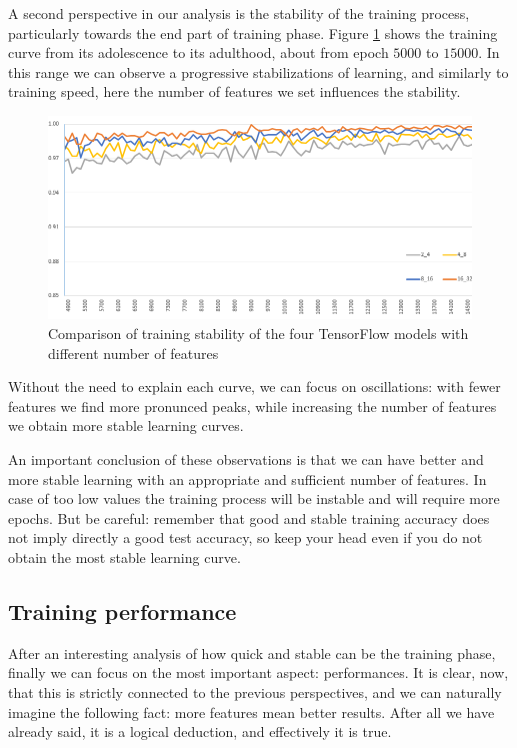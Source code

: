 A second perspective in our analysis is the stability of the training process, particularly towards the end part of training phase. Figure \ref{fig:training_stability} shows the training curve from its adolescence to its adulthood, about from epoch $5000$ to $15000$. In this range we can observe a progressive stabilizations of learning, and similarly to training speed, here the number of features we set influences the stability.

\begin{figure}
	\centering
	\includegraphics[width=1\textwidth]{Images/training_stability}
	\caption{Comparison of training stability of the four TensorFlow models with different number of features}
	\label{fig:training_stability}
\end{figure}

Without the need to explain each curve, we can focus on oscillations: with fewer features we find more pronunced peaks, while increasing the number of features we obtain more stable learning curves.

An important conclusion of these observations is that we can have better and more stable learning with an appropriate and sufficient number of features. In case of too low values the training process will be instable and will require more epochs. But be careful: remember that good and stable training accuracy does not imply directly a good test accuracy, so keep your head even if you do not obtain the most stable learning curve.

\subsection{Training performance}

After an interesting analysis of how quick and stable can be the training phase, finally we can focus on the most important aspect: performances. It is clear, now, that this is strictly connected to the previous perspectives, and we can naturally imagine the following fact: more features mean better results. After all we have already said, it is a logical deduction, and effectively it is true.

